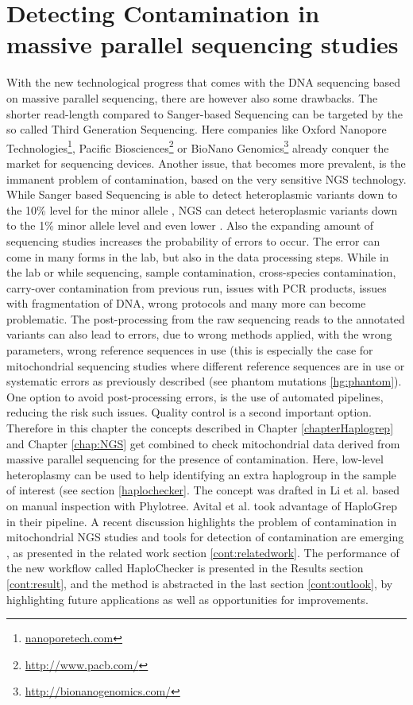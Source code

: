 \chapter{Detecting Contamination in massive parallel sequencing studies}
\label{chapterContamination}
With the new technological progress that comes with the DNA sequencing based on massive parallel sequencing, there are however also some drawbacks. The shorter read-length compared to Sanger-based Sequencing can be targeted by the so called Third Generation Sequencing. Here companies like Oxford Nanopore Technologies\footnote{\url{nanoporetech.com}}, Pacific Biosciences\footnote{\url{http://www.pacb.com/}} or BioNano Genomics\footnote{\url{http://bionanogenomics.com/}} already conquer the market for sequencing devices. Another issue, that becomes more prevalent, is the immanent problem of contamination, based on the very sensitive NGS technology. While Sanger based Sequencing is able to detect heteroplasmic variants down to the 10\% level for the minor allele \cite{Kloss-Brandstatter2015}, NGS can detect heteroplasmic variants down to the 1\% minor allele level and even lower \cite{Li2010}. Also the expanding amount of sequencing studies increases the probability of errors to occur. The error can come in many forms in the lab, but also in the data processing steps. While in the lab or while sequencing, sample contamination, cross-species contamination, carry-over contamination from previous run, issues with PCR products, issues with fragmentation of DNA, wrong protocols and many more can become problematic. The post-processing from the raw sequencing reads to the annotated variants can also lead to errors, due to wrong methods applied, with the wrong parameters, wrong reference sequences in use (this is especially the case for mitochondrial sequencing studies where different reference sequences are in use \cite{Behar2012,Andrews1999} or systematic errors as previously described (see phantom mutations \ref{hg:phantom}). One option to avoid post-processing errors, is the use of automated pipelines, reducing the risk such issues. Quality control is a second important option. Therefore in this chapter the concepts described in Chapter \ref{chapterHaplogrep} and Chapter \ref{chap:NGS} get combined to check mitochondrial data derived from massive parallel sequencing for the presence of contamination. Here, low-level heteroplasmy can be used to help identifying an extra haplogroup in the sample of interest (see section \ref{haplochecker}. The concept was drafted in Li et al. \cite{Li2010} based on manual inspection with Phylotree. Avital et al. \cite{Avital2012} took advantage of HaploGrep in their pipeline. A recent discussion highlights the problem of contamination in mitochondrial NGS studies \cite{Ye2014,Just2014, Just2015,Ye2014reply} and tools for detection of contamination are emerging \cite{Renaud2015,Jun2012,Dickins2014}, as presented in the related work section \ref{cont:relatedwork}. The performance of the new workflow called HaploChecker is presented in the Results section \ref{cont:result}, and the method is abstracted in the last section \ref{cont:outlook}, by highlighting future applications as well as opportunities for improvements.

